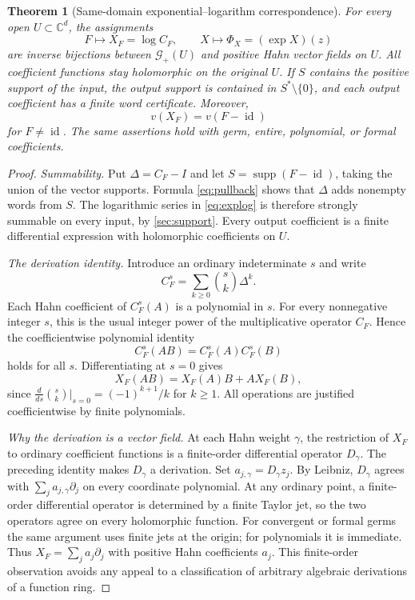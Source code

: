 \documentclass[11pt,letterpaper]{article}
\newtheorem{theorem}{Theorem}[section]
\theoremstyle{definition}
\theoremstyle{remark}
\newcommand{\C}{\mathbb C}
\newcommand{\GG}{\mathscr G}
\newcommand{\id}{\operatorname{id}}
\newcommand{\supp}{\operatorname{supp}}
\numberwithin{equation}{section}
\begin{document}
\begin{theorem}[Same-domain exponential--logarithm correspondence]
\label{thm:exp-log}
For every open $U\subset\C^d$, the assignments
\begin{equation}\label{eq:maplog}
 F\longmapsto X_F=\log C_F,
 \qquad
 X\longmapsto\Phi_X=(\exp X)(z)
\end{equation}
are inverse bijections between $\GG_+(U)$ and positive Hahn vector fields
on $U$. All coefficient functions stay holomorphic on the original $U$.
If $S$ contains the positive support of the input, the output support is
contained in $S^*\setminus\{0\}$, and each output coefficient has a finite
word certificate. Moreover,
\[
 v(X_F)=v(F-\id)
\]
for $F\ne\id$. The same assertions hold with germ, entire, polynomial, or
formal coefficients.
\end{theorem}
\begin{proof}
\emph{Summability.} Put $\Delta=C_F-I$ and let $S=\supp(F-\id)$, taking
the union of the vector supports. Formula \eqref{eq:pullback} shows that
$\Delta$ adds nonempty words from $S$. The logarithmic series in
\eqref{eq:explog} is therefore strongly summable on every input, by
\cref{sec:support}. Every output coefficient is a finite differential
expression with holomorphic coefficients on $U$.

\emph{The derivation identity.} Introduce an ordinary indeterminate $s$ and
write
\[
 C_F^s=\sum_{k\ge0}\binom{s}{k}\Delta^k.
\]
Each Hahn coefficient of $C_F^s(A)$ is a polynomial in $s$. For every
nonnegative integer $s$, this is the usual integer power of the
multiplicative operator $C_F$. Hence the coefficientwise polynomial identity
\[
 C_F^s(AB)=C_F^s(A)C_F^s(B)
\]
holds for all $s$. Differentiating at $s=0$ gives
\[
 X_F(AB)=X_F(A)B+A X_F(B),
\]
since $\frac{d}{ds}\binom{s}{k}|_{s=0}=(-1)^{k+1}/k$ for $k\ge1$.
All operations are justified coefficientwise by finite polynomials.

\emph{Why the derivation is a vector field.} At each Hahn weight $\gamma$,
the restriction of $X_F$ to ordinary coefficient functions is a finite-order
differential operator $D_\gamma$. The preceding identity makes
$D_\gamma$ a derivation. Set $a_{j,\gamma}=D_\gamma z_j$. By Leibniz,
$D_\gamma$ agrees with $\sum_j a_{j,\gamma}\partial_j$ on every coordinate
polynomial. At any ordinary point, a finite-order differential operator is
determined by a finite Taylor jet, so the two operators agree on every
holomorphic function. For convergent or formal germs the same argument uses
finite jets at the origin; for polynomials it is immediate. Thus
$X_F=\sum_j a_j\partial_j$ with positive Hahn coefficients $a_j$.
This finite-order observation avoids any appeal to a classification of
arbitrary algebraic derivations of a function ring.


\end{proof}
\end{document}

